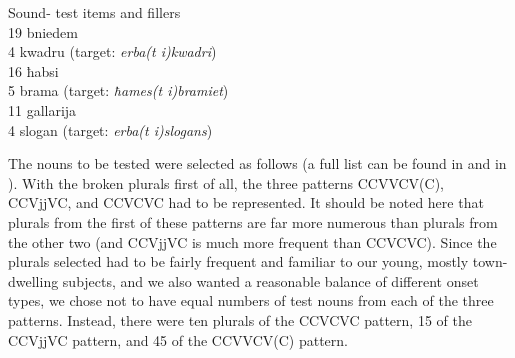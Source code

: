 \documentclass[output=paper]{langsci/langscibook}
\begin{document}
\ea\label{ex:lucas:4}
{Sound- test items and fillers}\\
\ea\label{ex:lucas:}
{   19      bniedem} \\
\ex
{            4        kwadru      (target: \textit{erba(t i)kwadri})}\\
\ex
{              16      ħabsi}\\
\ex
{            5        brama   (target: \textit{ħames(t i)bramiet})}\\
\ex
{              11      gallarija}\\
\ex
{              4        slogan   (target: \textit{erba(t i)slogans})}\\
\z
\z

The nouns to be tested were selected as follows (a full list can be found in  and  in ). With the broken plurals first of all, the three patterns CCVVCV(C), CCVjjVC, and CCVCVC had to be represented. It should be noted here that plurals from the first of these patterns are far more numerous than plurals from the other two (and CCVjjVC is much more frequent than CCVCVC). Since the plurals selected had to be fairly frequent and familiar to our young, mostly town-dwelling subjects, and we also wanted a reasonable balance of different onset types, we chose not to have equal numbers of test nouns from each of the three patterns. Instead, there were ten plurals of the CCVCVC pattern, 15 of the CCVjjVC pattern, and 45 of the CCVVCV(C) pattern. 
\end{document}
